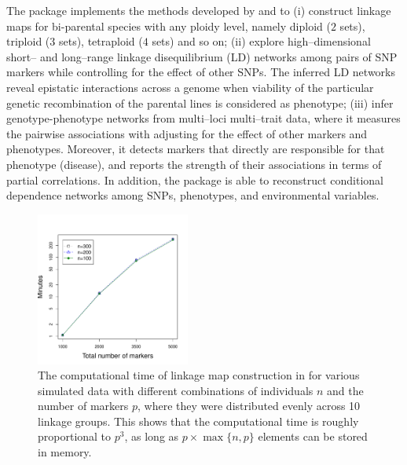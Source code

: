 The  package implements the methods developed by \cite{behrouzi2019novo} and \cite{behrouzi2019detecting} to (i) construct linkage maps for bi-parental species with any ploidy level, namely diploid ($2$ sets), triploid ($3$ sets), tetraploid ($4$ sets) and so on; (ii) explore high--dimensional short-- and long--range linkage disequilibrium (LD) networks among pairs of SNP markers while controlling for the effect of other SNPs. The inferred LD networks reveal epistatic interactions across a genome when viability of the particular genetic recombination of the parental lines is considered as phenotype; %
(iii) infer genotype-phenotype networks from multi--loci multi--trait data, where it measures the pairwise associations with adjusting for the effect of other markers and phenotypes. Moreover, it detects markers that directly are responsible for that phenotype (disease), and reports the strength of their associations in terms of partial correlations. %
In addition, the package is able to reconstruct conditional dependence networks among SNPs, phenotypes, and environmental variables. %

\begin{figure}[h]
	\centering
	\includegraphics[width=0.45\textwidth]{Fig9.pdf} 
	\vspace{-0.4cm}
	\caption{The computational time of linkage map construction in  for various simulated data with different combinations of individuals $n$ and the number of markers $p$, where they were distributed evenly across 10 linkage groups. This shows that the computational time is roughly proportional to $p^3$, as long as $p \times \max\{n,p\}$ elements can be stored in memory.} %
	\label{timingPlot}
\end{figure} 

